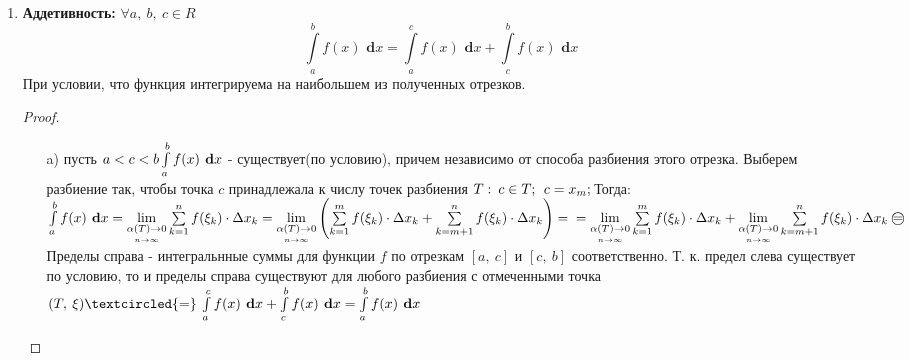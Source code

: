 \documentclass[a4paper,12pt, centered]{bookest}
\theoremstyle{remark}
\newcommand\dx{\textbf{ d}x}
\begin{document}
\begin{enumerate}
		$$
		f(x)\in R([a,\>b]);\>g(x)\in R([a,\>b]), \textrm{ то:} $$$$\int\limits_{a}^{b}(\alpha f(x)+\beta g(x) )\dx = \alpha\int\limits_{a}^{b}f(x)\dx+\beta \int\limits_{a}^{b}g(x)\dx
		$$\begin{proof}
			$\forall(T,\>\xi):\>\sum\limits_{k=1}^{n}(\alpha f(\xi_k)+\beta g(\xi_k))\cdot\Delta x_k=\alpha\sum\limits_{k=1}^{n} f(\xi_k)\Delta x_k+\beta\sum\limits_{k=1}^{n}g(\xi_k)\Delta x_k,\\\int\limits_{a}^{b}(\alpha f(x)+\beta g(x) )\dx=\lim\limits_{\underset{n\to\infty}{\alpha(T)\to0}}\sum\limits_{k=1}^{n}(\alpha f(\xi_k)+\beta g(\xi_k))\cdot\Delta x_k=\alpha\lim\limits_{\underset{n\to\infty}{\alpha(T)\to0}}\sum\limits_{k=1}^{n} f(\xi_k)\Delta x_k+\\+\beta\lim\limits_{\underset{n\to\infty}{\alpha(T)\to0}}\sum\limits_{k=1}^{n}g(\xi_k)\Delta x_k=\alpha\int\limits_{a}^{b}f(x)\dx+\beta\int\limits_{a}^{b}g(x)\dx$
		\end{proof}
	\item \textbf{Аддетивность:} $\forall a,\>b,\>c\in R$ $$\int\limits_{a}^{b}f(x)\dx=\int\limits_{a}^{c}f(x)\dx+\int\limits_{c}^{b}f(x)\dx$$ При условии, что функция интегрируема на наибольшем из полученных отрезков. \begin{proof}$ $
			\begin{itemize}
				\item [a)] пусть $a<c<b\\\int\limits_{a}^{b}f(x)\dx$ - существует(по условию), причем независимо от способа разбиения этого отрезка. Выберем разбиение так, чтобы 	точка $c$ принадлежала к числу точек разбиения $T:\>c\in T;\>\>c=x_m;\\$Тогда:\\$\int\limits_{a}^{b}f(x)\dx=\lim\limits_{\underset{n\to\infty}{\alpha(T)\to0}}\sum\limits_{k=1}^{n} f(\xi_k)\cdot\Delta x_k =\lim\limits_{\underset{n\to\infty}{\alpha(T)\to0}}\left(\sum\limits_{k=1}^{m} f(\xi_k)\cdot\Delta x_k+\sum\limits_{k=m+1}^{n} f(\xi_k)\cdot\Delta x_k \right)=\\=\lim\limits_{\underset{n\to\infty}{\alpha(T)\to0}}\sum\limits_{k=1}^{m} f(\xi_k)\cdot\Delta x_k+\lim\limits_{\underset{n\to\infty}{\alpha(T)\to0}}\sum\limits_{k=m+1}^{n} f(\xi_k)\cdot\Delta x_k\>\textrm{\textcircled{=}}\\$ Пределы справа - интегральнные суммы для функции $f$ по отрезкам $[a,\>c]$ и $[c,\>b]$ соответственно. Т. к. предел слева существует по условию, то и пределы справа существуют для любого разбиения с отмеченными точка $(T,\>\xi)\\\textcircled{=}\>\int\limits_{a}^{c}f(x)\dx+\int\limits_{c}^{b}f(x)\dx=\int\limits_{a}^{b}f(x)\dx$ 

\end{itemize}
\end{proof}
\end{enumerate}
\end{document}
